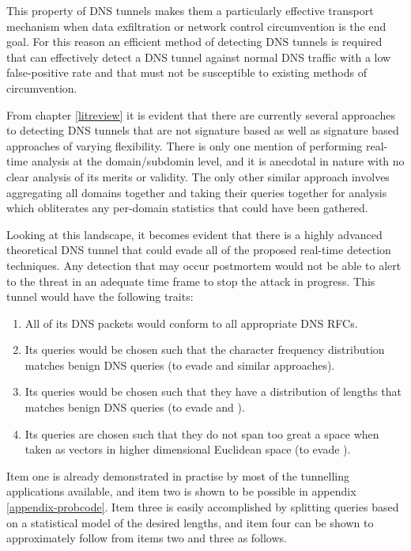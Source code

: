 \documentclass[12pt]{report}
\theoremstyle{remark}
\theoremstyle{definition}
\theoremstyle{definition}
\theoremstyle{definition}
\begin{document}
This property of DNS tunnels makes them a particularly effective transport
mechanism when data exfiltration or network control circumvention is the end
goal. For this reason an efficient method of detecting DNS tunnels is required
that can effectively detect a DNS tunnel against normal DNS traffic with a low
false-positive rate and that must not be susceptible to existing methods of
circumvention.

From chapter \ref{litreview} it is evident that there are currently several
approaches to detecting DNS tunnels that are not signature based as well as
signature based approaches of varying flexibility. There is only one mention of
performing real-time analysis at the domain/subdomin level, and it is anecdotal
in nature with no clear analysis of its merits or validity. The only other
similar approach involves aggregating all domains together and taking their
queries together for analysis which obliterates any per-domain statistics that
could have been gathered.

Looking at this landscape, it becomes evident that there is a highly advanced
theoretical DNS tunnel that could evade all of the proposed real-time detection
techniques. Any detection that may occur postmortem would not be able to alert
to the threat in an adequate time frame to stop the attack in progress. This
tunnel would have the following traits:

\label{supertunnel}
\begin{enumerate}
\item All of its DNS packets would conform
to all appropriate DNS RFCs.
\item Its queries would be chosen such that the
character frequency distribution matches benign DNS queries (to evade
\cite{Born2010.cfa} and similar approaches).
\item Its queries would be chosen
such that they have a distribution of lengths that matches benign DNS queries
(to evade \cite{Karasaridis2006} and \cite{SANS2013}).
\item Its queries are
chosen such that they do not span too great a space when taken as vectors in
higher dimensional Euclidean space (to evade \cite{jhind2009}). \end{enumerate}

Item one is already demonstrated in practise by most of the tunnelling
applications available, and item two is shown to be possible in appendix
\ref{appendix-probcode}. Item three is easily accomplished by splitting queries based
on a statistical model of the desired lengths, and item four can be shown to
approximately follow from items two and three as follows.
\end{document}
